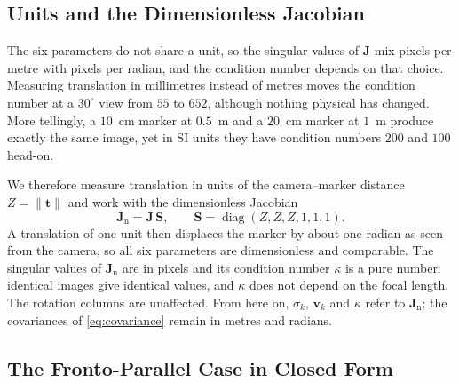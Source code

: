 \documentclass[11pt,a4paper]{article}
\theoremstyle{definition}
\theoremstyle{plain}
\theoremstyle{remark}
\begin{document}
\subsection{Units and the Dimensionless Jacobian}
\label{sec:units}

The six parameters do not share a unit, so the singular values of $\mathbf{J}$
mix pixels per metre with pixels per radian, and the condition number depends
on that choice. Measuring translation in millimetres instead of metres moves the
condition number at a $30^\circ$ view from $55$ to $652$, although nothing
physical has changed. More tellingly, a $10$~cm marker at $0.5$~m and a
$20$~cm marker at $1$~m produce exactly the same image, yet in SI units they
have condition numbers $200$ and $100$ head-on.

We therefore measure translation in units of the camera--marker distance
$Z = \|\mathbf{t}\|$ and work with the dimensionless Jacobian
\begin{equation}
  \mathbf{J}_{\mathrm{n}} = \mathbf{J}\,\mathbf{S},
  \qquad
  \mathbf{S} = \operatorname{diag}(Z,Z,Z,1,1,1).
  \label{eq:dimensionless}
\end{equation}
A translation of one unit then displaces the marker by about one radian as seen
from the camera, so all six parameters are dimensionless and comparable. The
singular values of $\mathbf{J}_{\mathrm{n}}$ are in pixels and its condition
number $\kappa$ is a pure number: identical images give identical values, and
$\kappa$ does not depend on the focal length. The rotation columns are
unaffected. From here on, $\sigma_k$, $\mathbf{v}_k$ and $\kappa$ refer to
$\mathbf{J}_{\mathrm{n}}$; the covariances of \eqref{eq:covariance} remain in
metres and radians.

\subsection{The Fronto-Parallel Case in Closed Form}
\label{sec:frontal}
\end{document}
